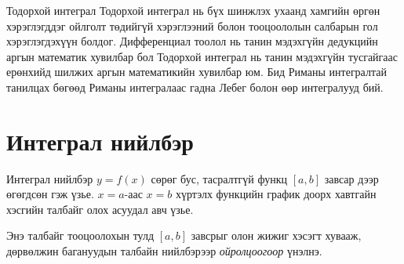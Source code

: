

\begin{frame}[allowframebreaks]{Тодорхой интеграл}
Тодорхой интеграл нь бүх шинжлэх ухаанд хамгийн өргөн хэрэглэгддэг 
ойлголт төдийгүй хэрэглээний болон тооцоололын салбарын гол хэрэглэгдэхүүн болдог. Дифференциал тоолол нь танин мэдэхгүйн дедукцийн аргын математик хувилбар бол Тодорхой интеграл нь танин мэдэхгүйн тусгайгаас ерөнхийд шилжих аргын математикийн хувилбар юм. Бид Риманы интегралтай танилцах бөгөөд Риманы интегралаас гадна Лебег болон өөр интегралууд бий.
\end{frame}

\section{Интеграл нийлбэр}
\begin{frame}[allowframebreaks]{Интеграл нийлбэр}
$y=f(x)$ сөрөг бус, тасралтгүй функц $[a,b]$ завсар дээр өгөгдсөн гэж үзье.  $x=a$-аас $x=b$ хүртэлх функцийн график доорх хавтгайн хэсгийн талбайг олох асуудал авч үзье.

\begin{center}
\begin{fitbox}\end{fitbox}
\end{center}
Энэ талбайг тооцоолохын тулд $[a,b]$ завсрыг олон жижиг хэсэгт хувааж,
дөрвөлжин багануудын талбайн нийлбэрээр \emph{ойролцоогоор} үнэлнэ.
\end{frame}

